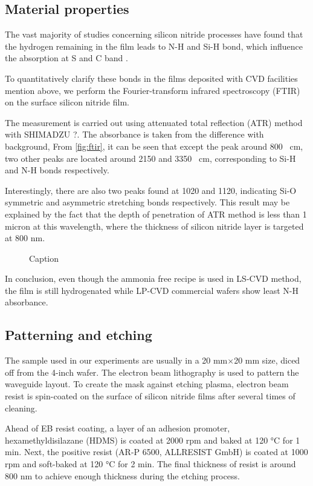 \subsection{Material properties}
The vast majority of studies concerning silicon nitride processes have found that the hydrogen remaining in the film leads to N-H and Si-H bond, which influence the absorption at S and C band \cites{Ay2004, Agnihotri2000}. 

To quantitatively clarify these bonds in the films deposited with CVD facilities mention above, we perform the Fourier-transform infrared spectroscopy (FTIR) on the surface silicon nitride film.

The measurement is carried out using attenuated total reflection (ATR) method with SHIMADZU ?. The absorbance is taken from the difference with background, From \autoref{fig:ftir}, it can be seen that except the peak around 800 \si{\per\cm}, two other peaks are located around 2150 and 3350 \si{\per\cm}, corresponding to Si-H and N-H bonds respectively.

Interestingly, there are also two peaks found at 1020 and 1120, indicating Si-O symmetric and asymmetric stretching bonds respectively. This result may be explained by the fact that the depth of penetration of ATR method is less than 1 micron at this wavelength, where the thickness of silicon nitride layer
is targeted at 800 nm.

\begin{figure}
    \centering
    
    \caption{Caption}
    \label{fig:ftir}
\end{figure}

In conclusion, even though the ammonia free recipe is used in LS-CVD method, the film is still hydrogenated while LP-CVD commercial wafers show least N-H absorbance.

\subsection{Patterning and etching}
The sample used in our experiments are usually in a 20 mm$\times$20 mm size, diced off from the 4-inch wafer. The electron beam lithography is used to pattern the waveguide layout. To create the mask against etching plasma, electron beam resist is spin-coated on the surface of silicon nitride films after several times of cleaning. 

Ahead of EB resist coating, a layer of an adhesion promoter, hexamethyldisilazane (HDMS) is coated at 2000 rpm and baked at 120 \si{\celsius} for 1 min. Next, the positive resist (AR-P 6500, ALLRESIST GmbH) is coated at 1000 rpm and soft-baked at 120 \si{\celsius} for 2 min. The final thickness of resist is around 800 nm to achieve enough thickness during the etching process. 

